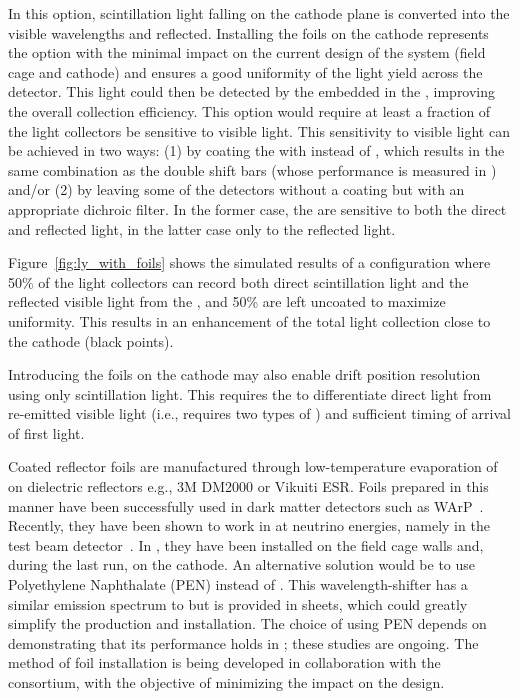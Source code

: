 
In this option, scintillation light falling on the cathode plane is converted into the visible wavelengths and reflected.
Installing the foils on the cathode represents the option  with the minimal impact on the current design of the  system (field cage and cathode) and ensures a good uniformity of the light yield across the detector.
This light could then be detected by the  embedded in the , improving the overall collection efficiency. This option would require at least a fraction of the light collectors be sensitive to visible light. This sensitivity to visible light can be achieved in two ways: (1) by coating the  with  instead of , which results in the same  combination as the double shift bars (whose performance is measured in )
and/or (2) by leaving some of the  detectors without a  
 coating but with an appropriate dichroic filter. In the former case, the  are sensitive to both the direct and reflected light, in the latter case only to the reflected light. 

Figure~\ref{fig:ly_with_foils} shows the simulated results of a configuration where 50\% of the  light collectors can %
record both direct scintillation light and the reflected visible light from the ,  and 50\% are left uncoated to maximize uniformity. This results in an enhancement of the total light collection close to the cathode (black points). %

Introducing the foils on the cathode may also enable drift position resolution using only scintillation light. This requires the  to  
differentiate direct  light from re-emitted visible light (i.e., requires two 
types of ) and 
sufficient timing of arrival of first light.

Coated reflector foils are manufactured through low-temperature evaporation of  on dielectric reflectors e.g., 3M DM2000 or Vikuiti ESR. Foils prepared in this manner have been successfully used in dark matter detectors such as WArP~\cite{Acciarri:2008kv}. Recently, they have been shown to work in  at neutrino energies, namely  in the  test beam detector~\cite{Garcia-Gamez:2017cmu}. In , they have been installed on the field cage walls and, during the last run, on the cathode. An alternative solution would be to use Polyethylene Naphthalate (PEN) instead of . This wavelength-shifter has a similar emission spectrum to  \cite{Kuzniak:2018dcf} but is provided in sheets, which could greatly simplify the production and installation. The choice of using PEN depends on demonstrating that its performance holds in \lar; these studies are ongoing. 
The method of foil installation is being developed in collaboration with the   consortium, with the objective of minimizing the impact on the  design. 



